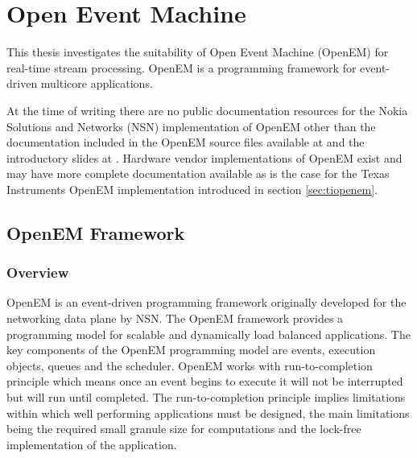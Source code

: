 \chapter{Open Event Machine}
\label{chapter:openem}
This thesis investigates the suitability of Open Event Machine (OpenEM) for real-time stream processing. OpenEM is a programming framework for event-driven multicore applications. 

At the time of writing there are no public documentation resources for the Nokia Solutions and Networks (NSN) implementation of OpenEM other than the documentation included in the OpenEM source files available at \cite{openempage} and the introductory slides at \cite{openemintro}. Hardware vendor implementations of OpenEM exist and may have more complete documentation available as is the case for the Texas Instruments OpenEM implementation introduced in section \ref{sec:tiopenem}.


\section{OpenEM Framework}
\label{sec:emframework}
\subsection{Overview}
OpenEM is an event-driven programming framework originally developed for the networking data plane by NSN. The OpenEM framework provides a programming model for scalable and dynamically load balanced applications. The key components of the OpenEM programming model are events, execution objects, queues and the scheduler. OpenEM works with run-to-completion principle which means once an event begins to execute it will not be interrupted but will run until completed. The run-to-completion principle implies limitations within which well performing applications must be designed, the main limitations being the required small granule size for computations and the lock-free implementation of the application. \cite{openempage}

